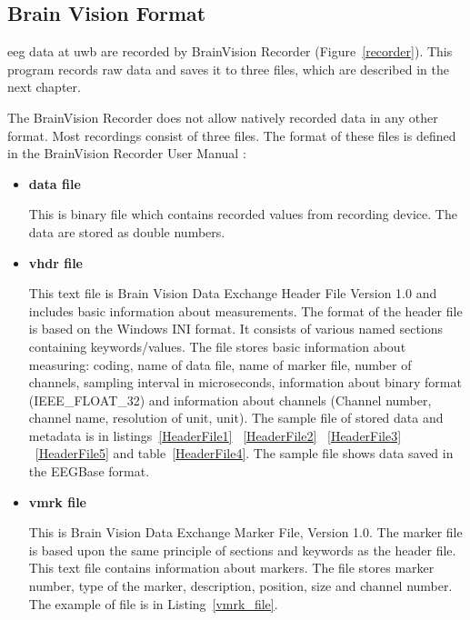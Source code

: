 \subsection{Brain Vision Format}

\gls{eeg} data at \gls{uwb} are recorded by BrainVision Recorder \cite{brainvision} (Figure~\ref{recorder}). This program records raw data and saves it to three files, which are described in the next chapter. 

The BrainVision Recorder does not allow natively recorded data in any other format. Most recordings consist of three files. The format of these files is defined in the BrainVision Recorder User Manual \cite{brainUserManual}:
\begin{itemize}
	\item \textbf{data file}
	\label{eeg}
	
	This is binary file which contains recorded values from recording device. The data are stored as double numbers.
	
	\item \textbf{vhdr file}
	\label{vhdr}
	
	This text file is Brain Vision Data Exchange Header File Version 1.0 and includes basic information about measurements. The format of the header file is based on the Windows INI format. It consists of various named sections containing keywords/values. The file stores basic information about measuring: coding, name of data file, name of marker file, number of channels, sampling interval in microseconds, information about binary format (IEEE\_FLOAT\_32) and information about channels (Channel number, channel name, resolution of unit, unit). The sample file of stored data and metadata is in listings~\ref{HeaderFile1} ~\ref{HeaderFile2} ~\ref{HeaderFile3} ~\ref{HeaderFile5} and table~\ref{HeaderFile4}. The sample file shows data saved in the EEGBase format.
	
	\item \textbf{vmrk file}
	\label{vmrk}
	
	This is Brain Vision Data Exchange Marker File, Version 1.0. The marker file is based upon the same principle of sections and keywords as the header file. This text file contains information about markers. The file stores marker number, type of the marker, description, position, size and channel number. The example of file is in Listing~\ref{vmrk_file}.
	
\end{itemize}




